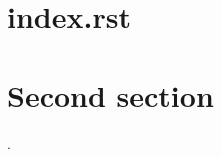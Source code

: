 \usepackage[utf8]{inputenc}
\usepackage[T1]{fontenc}
\usepackage{imakeidx}
\makeindex[columns=3, title=Alphabetical Index, intoc]

\begin{docs-1}

\tableofcontents

\section{index.rst}


\clearpage

\section{Second section}
.

\printindex
\end{docs-1}
